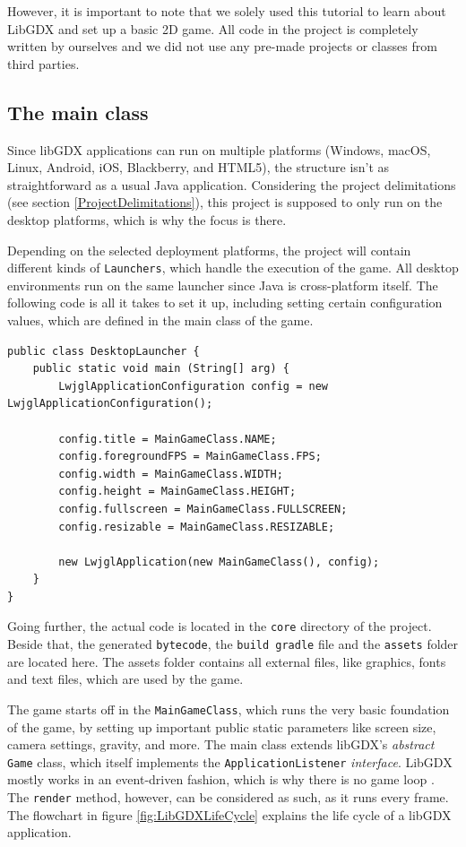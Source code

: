 \documentclass[12p]{article}
\begin{document}
However, it is important to note that we solely used this tutorial to learn about LibGDX and set up a basic 2D game. All code in the project is completely written by ourselves and we did not use any pre-made projects or classes from third parties.


\newpage
\subsection{The main class} \label{DocMainClass}

Since libGDX applications can run on multiple platforms (Windows, macOS, Linux, Android, iOS, Blackberry, and HTML5), the structure isn't as straightforward as a usual Java application. Considering the project delimitations (see section \ref{ProjectDelimitations}), this project is supposed to only run on the desktop platforms, which is why the focus is there.

Depending on the selected deployment platforms, the project will contain different kinds of \texttt{Launchers}, which handle the execution of the game. All desktop environments run on the same launcher since Java is cross-platform itself. The following code is all it takes to set it up, including setting certain configuration values, which are defined in the main class of the game.

\begin{verbatim}
public class DesktopLauncher {
	public static void main (String[] arg) {
		LwjglApplicationConfiguration config = new LwjglApplicationConfiguration();

		config.title = MainGameClass.NAME;
		config.foregroundFPS = MainGameClass.FPS;
		config.width = MainGameClass.WIDTH;
		config.height = MainGameClass.HEIGHT;
		config.fullscreen = MainGameClass.FULLSCREEN;
		config.resizable = MainGameClass.RESIZABLE;

		new LwjglApplication(new MainGameClass(), config);
	}
}
\end{verbatim}

Going further, the actual code is located in the \texttt{core} directory of the project. Beside that, the generated \texttt{bytecode}, the \texttt{build gradle} file and the \texttt{assets} folder are located here. The assets folder contains all external files, like graphics, fonts and text files, which are used by the game.

The game starts off in the \texttt{MainGameClass}, which runs the very basic foundation of the game, by setting up important public static parameters like screen size, camera settings, gravity, and more. The main class extends libGDX's \emph{abstract} \texttt{Game} class, which itself implements the \texttt{ApplicationListener} \emph{interface}. LibGDX mostly works in an event-driven fashion, which is why there is no game loop \cite{libGDXLifeCycle}. The \texttt{render} method, however, can be considered as such, as it runs every frame. The flowchart in figure \ref{fig:LibGDXLifeCycle} explains the life cycle of a libGDX application.
\end{document}
